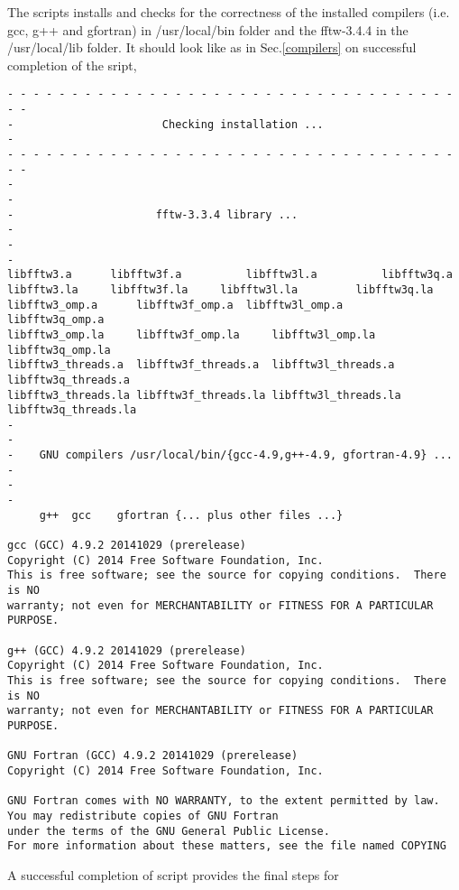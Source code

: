 \documentclass[review]{elsarticle}
\begin{document}
The scripts installs and checks for the correctness of the installed
compilers (i.e. gcc, g++ and gfortran) in /usr/local/bin folder and
the fftw-3.4.4 in the /usr/local/lib folder. It should look like as in
Sec.{\ref{compilers}} on successful completion of the sript,

\begin{verbatim}
- - - - - - - - - - - - - - - - - - - - - - - - - - - - - - - - - - - - -
-                       Checking installation ...                       -
- - - - - - - - - - - - - - - - - - - - - - - - - - - - - - - - - - - - -
-                                                                       -
-                      fftw-3.3.4 library ...                           -
-                                                                       -
libfftw3.a	    libfftw3f.a	         libfftw3l.a	      libfftw3q.a
libfftw3.la	    libfftw3f.la	 libfftw3l.la	      libfftw3q.la
libfftw3_omp.a	    libfftw3f_omp.a	 libfftw3l_omp.a      libfftw3q_omp.a
libfftw3_omp.la	    libfftw3f_omp.la     libfftw3l_omp.la     libfftw3q_omp.la
libfftw3_threads.a  libfftw3f_threads.a  libfftw3l_threads.a  libfftw3q_threads.a
libfftw3_threads.la libfftw3f_threads.la libfftw3l_threads.la libfftw3q_threads.la
-                                                                       -
-    GNU compilers /usr/local/bin/{gcc-4.9,g++-4.9, gfortran-4.9} ...   -
-                                                                       -
     g++  gcc    gfortran {... plus other files ...}

gcc (GCC) 4.9.2 20141029 (prerelease)
Copyright (C) 2014 Free Software Foundation, Inc.
This is free software; see the source for copying conditions.  There is NO
warranty; not even for MERCHANTABILITY or FITNESS FOR A PARTICULAR PURPOSE.

g++ (GCC) 4.9.2 20141029 (prerelease)
Copyright (C) 2014 Free Software Foundation, Inc.
This is free software; see the source for copying conditions.  There is NO
warranty; not even for MERCHANTABILITY or FITNESS FOR A PARTICULAR PURPOSE.

GNU Fortran (GCC) 4.9.2 20141029 (prerelease)
Copyright (C) 2014 Free Software Foundation, Inc.

GNU Fortran comes with NO WARRANTY, to the extent permitted by law.
You may redistribute copies of GNU Fortran
under the terms of the GNU General Public License.
For more information about these matters, see the file named COPYING
\end{verbatim}
A successful completion of script provides the final steps for
\end{document}
